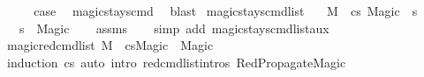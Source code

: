 \begin{isabellebody}
\ \ \isamarkupfalse%
\ \isamarkupfalse%
\ {\isacharquery}{\kern0pt}case\ \isamarkupfalse%
\ magic{\isacharunderscore}{\kern0pt}stays{\isacharunderscore}{\kern0pt}cmd\ \isamarkupfalse%
\ blast\isanewline
{}\isamarkupfalse%
%
\endisatagproof
{\isafoldproof}%
%
\isadelimproof
\isanewline
%
\endisadelimproof
\isanewline
{}\isamarkupfalse%
\ magic{\isacharunderscore}{\kern0pt}stays{\isacharunderscore}{\kern0pt}cmd{\isacharunderscore}{\kern0pt}list{\isacharcolon}{\kern0pt}\isanewline
\ \ \ {\isachardoublequoteopen}M{\isacharcomma}{\kern0pt}{\isasymLambda}{\isacharcomma}{\kern0pt}{\isasymGamma}{\isacharcomma}{\kern0pt}{\isasymOmega}\ {\isasymturnstile}\ {\isasymlangle}cs{\isacharcomma}{\kern0pt}\ Magic{\isasymrangle}\ {\isacharbrackleft}{\kern0pt}{\isasymrightarrow}{\isacharbrackright}{\kern0pt}\ s{\isacharprime}{\kern0pt}{\isachardoublequoteclose}\isanewline
\ \ \ {\isachardoublequoteopen}s{\isacharprime}{\kern0pt}\ {\isacharequal}{\kern0pt}\ Magic{\isachardoublequoteclose}\isanewline
%
\isadelimproof
\ \ %
\endisadelimproof
%
\isatagproof
{}\isamarkupfalse%
\ assms\isanewline
\ \ \isamarkupfalse%
\ {\isacharparenleft}{\kern0pt}simp\ add{\isacharcolon}{\kern0pt}\ magic{\isacharunderscore}{\kern0pt}stays{\isacharunderscore}{\kern0pt}cmd{\isacharunderscore}{\kern0pt}list{\isacharunderscore}{\kern0pt}aux{\isacharparenright}{\kern0pt}%
\endisatagproof
{\isafoldproof}%
%
\isadelimproof
\isanewline
%
\endisadelimproof
\isanewline
{}\isamarkupfalse%
\ magic{\isacharunderscore}{\kern0pt}red{\isacharunderscore}{\kern0pt}cmd{\isacharunderscore}{\kern0pt}list{\isacharcolon}{\kern0pt}\ {\isachardoublequoteopen}M{\isacharcomma}{\kern0pt}{\isasymLambda}{\isacharprime}{\kern0pt}{\isacharcomma}{\kern0pt}{\isasymGamma}{\isacharcomma}{\kern0pt}{\isasymOmega}\ {\isasymturnstile}\ {\isasymlangle}cs{\isacharcomma}{\kern0pt}Magic{\isasymrangle}\ {\isacharbrackleft}{\kern0pt}{\isasymrightarrow}{\isacharbrackright}{\kern0pt}\ Magic{\isachardoublequoteclose}\isanewline
%
\isadelimproof
\ \ %
\endisadelimproof
%
\isatagproof
{}\isamarkupfalse%
\ {\isacharparenleft}{\kern0pt}induction\ cs{\isacharparenright}{\kern0pt}\ {\isacharparenleft}{\kern0pt}auto\ intro{\isacharcolon}{\kern0pt}\ red{\isacharunderscore}{\kern0pt}cmd{\isacharunderscore}{\kern0pt}list{\isachardot}{\kern0pt}intros\ RedPropagateMagic{\isacharparenright}{\kern0pt}%
\endisatagproof
{\isafoldproof}%

\end{isabellebody}
